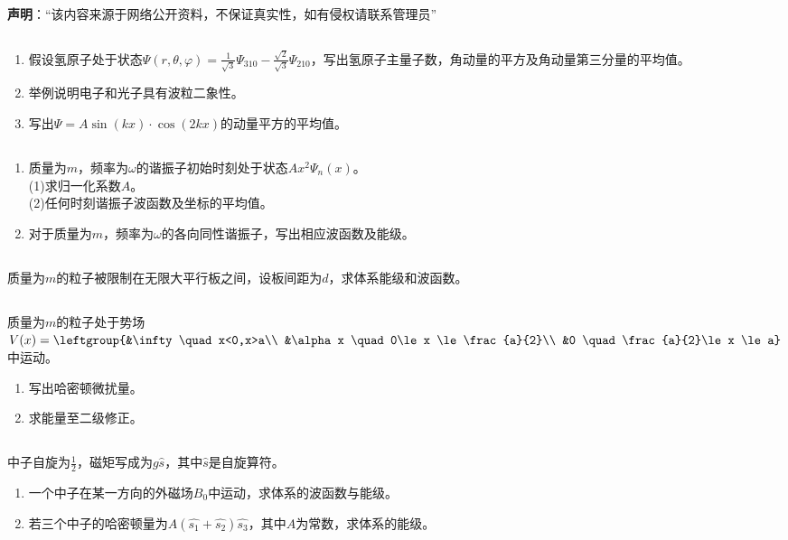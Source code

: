 
\textbf{声明}：“该内容来源于网络公开资料，不保证真实性，如有侵权请联系管理员”

\subsection{ }
\begin{enumerate}
\item 假设氢原子处于状态$\Psi (r,\theta,\varphi)=\frac{1}{\sqrt{3}}\Psi_{310}-\frac{\sqrt{2}}{\sqrt{3}}\Psi_{210}$，写出氢原子主量子数，角动量的平方及角动量第三分量的平均值。
\item 举例说明电子和光子具有波粒二象性。
\item 写出$\Psi = A \sin(kx)\cdot\cos(2kx)$的动量平方的平均值。
\end{enumerate}
\subsection{ }
\begin{enumerate}
\item 质量为$m$，频率为$\omega$的谐振子初始时刻处于状态$Ax^2\Psi_n(x)$。\\
(1)求归一化系数$A$。\\
(2)任何时刻谐振子波函数及坐标的平均值。
\item 对于质量为$m$，频率为$\omega$的各向同性谐振子，写出相应波函数及能级。
\end{enumerate}
\subsection{ }
质量为$m$的粒子被限制在无限大平行板之间，设板间距为$d$，求体系能级和波函数。
\subsection{ }
质量为$m$的粒子处于势场$V(x)=\leftgroup{&\infty \quad x<0,x>a\\ &\alpha x \quad 0\le x \le \frac{a}{2}\\ &0 \quad \frac{a}{2}\le x \le a} $中运动。
\begin{enumerate}
\item 写出哈密顿微扰量。
\item 求能量至二级修正。
\end{enumerate}
\subsection{ }
中子自旋为$\frac{1}{2}$，磁矩写成为$g\hat{s}$，其中$\hat{s}$是自旋算符。
\begin{enumerate}
\item 一个中子在某一方向的外磁场$B_0$中运动，求体系的波函数与能级。
\item 若三个中子的哈密顿量为$A(\hat{s_1}+\hat{s_2})\hat{s_3} $，其中$A$为常数，求体系的能级。
\end{enumerate}
